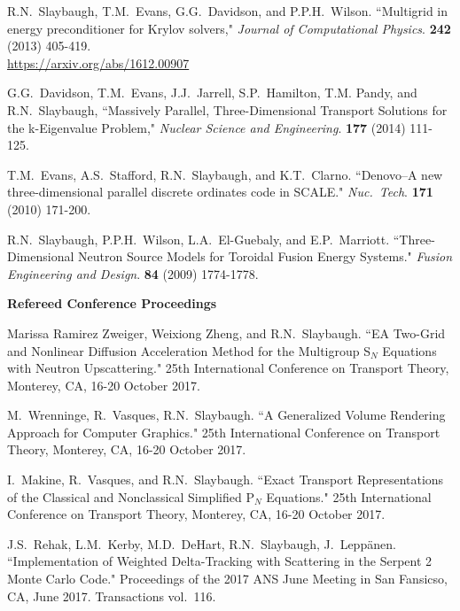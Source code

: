 \begin{bibsection}
\item R.N.\ Slaybaugh, T.M.\ Evans, G.G.\ Davidson, and P.P.H.\ Wilson. ``Multigrid in energy preconditioner for Krylov solvers," \textit{Journal of Computational Physics}. \textbf{242} (2013) 405-419.\\
\url{https://arxiv.org/abs/1612.00907}

\item G.G.\ Davidson, T.M.\ Evans, J.J.\ Jarrell, S.P.\ Hamilton, T.M. Pandy, and R.N.\ Slaybaugh, ``Massively Parallel, Three-Dimensional Transport Solutions for the k-Eigenvalue Problem," \textit{Nuclear Science and Engineering}. \textbf{177} (2014) 111-125.

\item T.M.\ Evans, A.S.\ Stafford, R.N.\ Slaybaugh, and K.T.\ Clarno. ``Denovo--A new three-dimensional parallel discrete ordinates code in SCALE." \textit{Nuc.\ Tech}. \textbf{171} (2010) 171-200.

\item R.N.\ Slaybaugh, P.P.H.\ Wilson, L.A.\ El-Guebaly, and E.P.\ Marriott. ``Three-Dimensional Neutron Source Models for Toroidal Fusion Energy Systems." \textit{Fusion Engineering and Design}. \textbf{84} (2009) 1774-1778. 

\item \textbf{Refereed Conference Proceedings}
\item  Marissa Ramirez Zweiger, Weixiong Zheng, and R.N.\ Slaybaugh. ``EA Two-Grid and Nonlinear Diffusion Acceleration Method for the Multigroup S$_N$ Equations with Neutron Upscattering." 25th International Conference on Transport Theory, Monterey, CA, 16-20 October 2017.

\item M.\ Wrenninge, R.\ Vasques, R.N.\ Slaybaugh. ``A Generalized Volume Rendering Approach for Computer Graphics." 25th International Conference on Transport Theory, Monterey, CA, 16-20 October 2017.

\item  I.\ Makine, R.\ Vasques, and R.N.\ Slaybaugh. ``Exact Transport Representations of the Classical and Nonclassical Simplified P$_N$ Equations." 25th International Conference on Transport Theory, Monterey, CA, 16-20 October 2017.

\item J.S.\ Rehak, L.M.\ Kerby, M.D.\ DeHart, R.N.\ Slaybaugh, J.\ Lepp\"{a}nen. ``Implementation of Weighted Delta-Tracking with Scattering in the Serpent 2 Monte Carlo Code." Proceedings of the 2017 ANS June Meeting in San Fansicso, CA, June 2017. Transactions vol.\ 116.


\end{bibsection}

